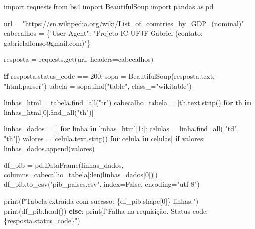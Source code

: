 \documentclass[
  brazilian,
  letterpaper,
  DIV=11,
  numbers=noendperiod]{scrreprt}
\newenvironment{Shaded}{\begin{snugshade}}{\end{snugshade}}
\newcommand{\BuiltInTok}[1]{\textcolor[rgb]{0.00,0.23,0.31}{#1}}
\newcommand{\ControlFlowTok}[1]{\textcolor[rgb]{0.00,0.23,0.31}{\textbf{#1}}}
\newcommand{\DecValTok}[1]{\textcolor[rgb]{0.68,0.00,0.00}{#1}}
\newcommand{\ImportTok}[1]{\textcolor[rgb]{0.00,0.46,0.62}{#1}}
\newcommand{\KeywordTok}[1]{\textcolor[rgb]{0.00,0.23,0.31}{\textbf{#1}}}
\newcommand{\NormalTok}[1]{\textcolor[rgb]{0.00,0.23,0.31}{#1}}
\newcommand{\OperatorTok}[1]{\textcolor[rgb]{0.37,0.37,0.37}{#1}}
\newcommand{\SpecialCharTok}[1]{\textcolor[rgb]{0.37,0.37,0.37}{#1}}
\newcommand{\SpecialStringTok}[1]{\textcolor[rgb]{0.13,0.47,0.30}{#1}}
\newcommand{\StringTok}[1]{\textcolor[rgb]{0.13,0.47,0.30}{#1}}
\newcommand{\VariableTok}[1]{\textcolor[rgb]{0.07,0.07,0.07}{#1}}
\begin{document}
\begin{Shaded}
\begin{Highlighting}[]
\ImportTok{import}\NormalTok{ requests}
\ImportTok{from}\NormalTok{ bs4 }\ImportTok{import}\NormalTok{ BeautifulSoup}
\ImportTok{import}\NormalTok{ pandas }\ImportTok{as}\NormalTok{ pd}

\NormalTok{url }\OperatorTok{=} \StringTok{"https://en.wikipedia.org/wiki/List\_of\_countries\_by\_GDP\_(nominal)"}
\NormalTok{cabecalhos }\OperatorTok{=}\NormalTok{ \{}\StringTok{"User{-}Agent"}\NormalTok{: }\StringTok{"Projeto{-}IC{-}UFJF{-}Gabriel (contato: gabrielaffonso@gmail.com)"}\NormalTok{\}}

\NormalTok{resposta }\OperatorTok{=}\NormalTok{ requests.get(url, headers}\OperatorTok{=}\NormalTok{cabecalhos)}

\ControlFlowTok{if}\NormalTok{ resposta.status\_code }\OperatorTok{==} \DecValTok{200}\NormalTok{:}
\NormalTok{    sopa }\OperatorTok{=}\NormalTok{ BeautifulSoup(resposta.text, }\StringTok{"html.parser"}\NormalTok{)}
\NormalTok{    tabela }\OperatorTok{=}\NormalTok{ sopa.find(}\StringTok{"table"}\NormalTok{, class\_}\OperatorTok{=}\StringTok{"wikitable"}\NormalTok{)}

\NormalTok{    linhas\_html }\OperatorTok{=}\NormalTok{ tabela.find\_all(}\StringTok{"tr"}\NormalTok{)}
\NormalTok{    cabecalho\_tabela }\OperatorTok{=}\NormalTok{ [th.text.strip() }\ControlFlowTok{for}\NormalTok{ th }\KeywordTok{in}\NormalTok{ linhas\_html[}\DecValTok{0}\NormalTok{].find\_all(}\StringTok{"th"}\NormalTok{)]}

\NormalTok{    linhas\_dados }\OperatorTok{=}\NormalTok{ []}
    \ControlFlowTok{for}\NormalTok{ linha }\KeywordTok{in}\NormalTok{ linhas\_html[}\DecValTok{1}\NormalTok{:]:}
\NormalTok{        celulas }\OperatorTok{=}\NormalTok{ linha.find\_all([}\StringTok{"td"}\NormalTok{, }\StringTok{"th"}\NormalTok{])}
\NormalTok{        valores }\OperatorTok{=}\NormalTok{ [celula.text.strip() }\ControlFlowTok{for}\NormalTok{ celula }\KeywordTok{in}\NormalTok{ celulas]}
        \ControlFlowTok{if}\NormalTok{ valores:}
\NormalTok{            linhas\_dados.append(valores)}

\NormalTok{    df\_pib }\OperatorTok{=}\NormalTok{ pd.DataFrame(linhas\_dados, columns}\OperatorTok{=}\NormalTok{cabecalho\_tabela[:}\BuiltInTok{len}\NormalTok{(linhas\_dados[}\DecValTok{0}\NormalTok{])])}
\NormalTok{    df\_pib.to\_csv(}\StringTok{"pib\_paises.csv"}\NormalTok{, index}\OperatorTok{=}\VariableTok{False}\NormalTok{, encoding}\OperatorTok{=}\StringTok{"utf{-}8"}\NormalTok{)}

    \BuiltInTok{print}\NormalTok{(}\SpecialStringTok{f"Tabela extraída com sucesso: }\SpecialCharTok{\{}\NormalTok{df\_pib}\SpecialCharTok{.}\NormalTok{shape[}\DecValTok{0}\NormalTok{]}\SpecialCharTok{\}}\SpecialStringTok{ linhas."}\NormalTok{)}
    \BuiltInTok{print}\NormalTok{(df\_pib.head())}
\ControlFlowTok{else}\NormalTok{:}
    \BuiltInTok{print}\NormalTok{(}\SpecialStringTok{f"Falha na requisição. Status code: }\SpecialCharTok{\{}\NormalTok{resposta}\SpecialCharTok{.}\NormalTok{status\_code}\SpecialCharTok{\}}\SpecialStringTok{"}\NormalTok{)}
\end{Highlighting}
\end{Shaded}
\end{document}
